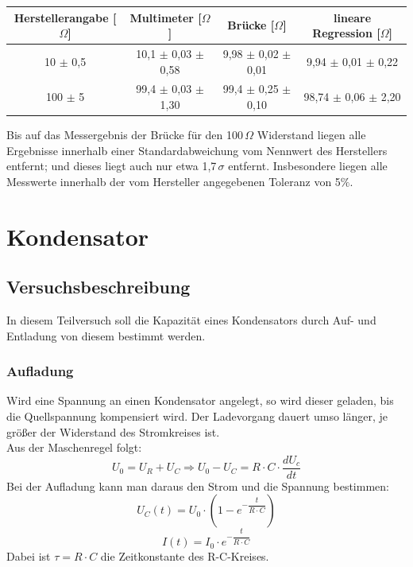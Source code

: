 \documentclass[12pt,a4paper]{article}
\begin{document}
\begin{center}
\begin{tabular}{|c|c|c|c|}
\hline 
Herstellerangabe [$\Omega$] & Multimeter [$\Omega$] & Brücke [$\Omega$] & lineare Regression [$\Omega$] \\ 
\hline 
10 $\pm$ 0,5 & 10,1 $\pm$ 0,03 $\pm$ 0,58 & 9,98 $\pm$ 0,02 $\pm$ 0,01 & 9,94 $\pm$ 0,01 $\pm$ 0,22 \\ 
\hline 
100 $\pm$ 5 & 99,4 $\pm$ 0,03 $\pm$ 1,30 & 99,4 $\pm$ 0,25 $\pm$ 0,10 & 98,74 $\pm$ 0,06 $\pm$ 2,20 \\ 
\hline 
\end{tabular}
\label{tab:Widerstand_Ergebnisse}
\end{center}

Bis auf das Messergebnis der Brücke für den 100$\, \Omega$ Widerstand liegen alle Ergebnisse innerhalb einer Standardabweichung vom Nennwert des Herstellers entfernt; und dieses liegt auch nur etwa 1,7$\, \sigma$ entfernt. Insbesondere liegen alle Messwerte innerhalb der vom Hersteller angegebenen Toleranz von 5$\%$.

\newpage
\section{Kondensator}
\subsection{Versuchsbeschreibung}
In diesem Teilversuch soll die Kapazität eines Kondensators durch Auf- und Entladung von diesem bestimmt werden.
\subsubsection{Aufladung}
Wird eine Spannung an einen Kondensator angelegt, so wird dieser geladen, bis die Quellspannung kompensiert wird. Der Ladevorgang dauert umso länger, je größer der Widerstand des Stromkreises ist.\\
Aus der Maschenregel folgt:
\begin{equation}
U_0 = U_R + U_C \Rightarrow U_0 - U_C = R\cdot C\cdot \dfrac{dU_c}{dt}
\label{Kondensator_DGL}
\end{equation}
Bei der Aufladung kann man daraus den Strom und die Spannung bestimmen:
\begin{equation}
U_C(t) = U_0 \cdot (1-e^{-\dfrac{t}{R\cdot C}})
\end{equation}
\begin{equation}
I(t) = I_0 \cdot e^{-\dfrac{t}{R\cdot C}}
\end{equation}
Dabei ist $\tau = R \cdot C$ die Zeitkonstante des R-C-Kreises.
\end{document}
